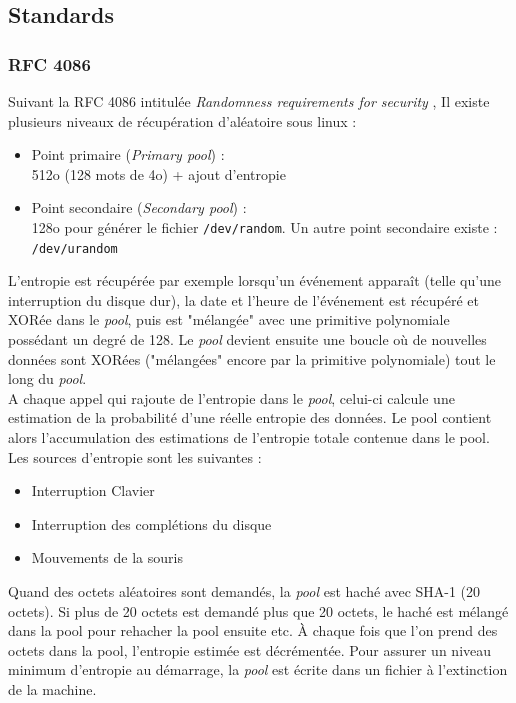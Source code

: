 \subsection{Standards}
\subsubsection{RFC 4086}
Suivant la RFC 4086 \nocite{rfc4086} intitulée \textit{Randomness requirements for security} \nocite{rfc4086}, 
Il existe plusieurs niveaux de récupération d'aléatoire sous linux  :
\begin{itemize}
\item Point primaire (\textit{Primary pool}) :\\
512o (128 mots de 4o) + ajout d’entropie
\item Point secondaire (\textit{Secondary pool}) :\\
128o pour générer le fichier \texttt{/dev/random}. Un autre point secondaire existe : \texttt{/dev/urandom}\\
\end{itemize}

L'entropie est récupérée par exemple lorsqu'un événement apparaît (telle qu'une interruption du disque dur), la date et l'heure de l'événement est récupéré et XORée dans le \textit{pool}, puis  est "mélangée" avec une primitive polynomiale possédant un degré de 128. Le \textit{pool} devient ensuite une boucle où de nouvelles données sont XORées ("mélangées" encore par la primitive polynomiale) tout le long du \textit{pool}.\\


A chaque appel qui rajoute de l'entropie dans le \textit{pool}, celui-ci calcule une estimation de la probabilité d'une réelle entropie des données. Le pool contient alors l'accumulation des estimations de l'entropie totale contenue dans le pool.\\


Les sources d'entropie sont les suivantes :
\begin{itemize}
\item Interruption Clavier  
\item Interruption des complétions du disque
\item Mouvements de la souris
\end{itemize}

Quand des octets aléatoires sont demandés, la \textit{pool} est haché avec SHA-1 (20 octets). Si plus de 20 octets  est demandé plus que 20 octets, le haché est mélangé dans la pool pour rehacher la pool ensuite etc. À chaque fois que l’on prend des octets dans la pool, l’entropie estimée est décrémentée. Pour assurer un niveau minimum d'entropie au démarrage, la \textit{pool} est écrite dans un fichier à l'extinction de la machine.\\


